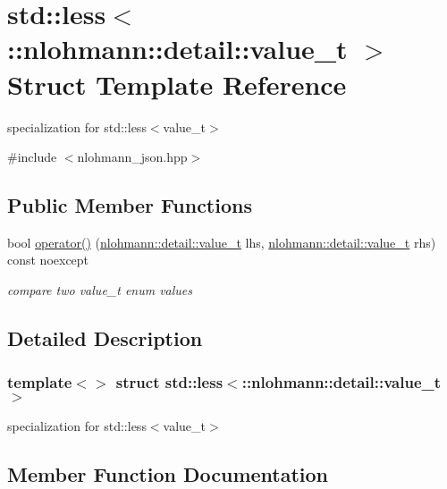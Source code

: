 \hypertarget{structstd_1_1less_3_1_1nlohmann_1_1detail_1_1value__t_01_4}{}\section{std\+:\+:less$<$\+:\+:nlohmann\+:\+:detail\+:\+:value\+\_\+t $>$ Struct Template Reference}
\label{structstd_1_1less_3_1_1nlohmann_1_1detail_1_1value__t_01_4}


specialization for std\+::less$<$value\+\_\+t$>$  




{\ttfamily \#include $<$nlohmann\+\_\+json.\+hpp$>$}

\subsection*{Public Member Functions}
\begin{DoxyCompactItemize}
\item 
bool \hyperlink{structstd_1_1less_3_1_1nlohmann_1_1detail_1_1value__t_01_4_a10d3fea50edf7b15ead8f4ceeb006000}{operator()} (\hyperlink{namespacenlohmann_1_1detail_a90aa5ef615aa8305e9ea20d8a947980f}{nlohmann\+::detail\+::value\+\_\+t} lhs, \hyperlink{namespacenlohmann_1_1detail_a90aa5ef615aa8305e9ea20d8a947980f}{nlohmann\+::detail\+::value\+\_\+t} rhs) const noexcept
\begin{DoxyCompactList}\small\item\em compare two value\+\_\+t enum values \end{DoxyCompactList}\end{DoxyCompactItemize}


\subsection{Detailed Description}
\subsubsection*{template$<$$>$\newline
struct std\+::less$<$\+::nlohmann\+::detail\+::value\+\_\+t $>$}

specialization for std\+::less$<$value\+\_\+t$>$ 

\subsection{Member Function Documentation}
\mbox{\label{structstd_1_1less_3_1_1nlohmann_1_1detail_1_1value__t_01_4_a10d3fea50edf7b15ead8f4ceeb006000}} 
